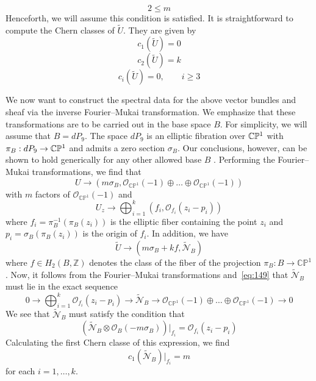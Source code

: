 \documentclass[a4paper,12pt]{article}
\numberwithin{equation}{section}
\newcommand{\cp}[1]{{\mathbb C}{\mathbb P}^{#1}}
\def\cN{{\mathcal N}}
\def\cO{{\mathcal O}}
\theoremstyle{plain}
\begin{document}
\begin{equation}
2 \leq m
\label{eq:150A}
\end{equation}
Henceforth, we will assume this condition is satisfied.
It is straightforward to compute the Chern classes of
$\widetilde{U}$. They are given by
\begin{equation}
c_{1}(\widetilde{U})=0
\label{eq:151}
\end{equation}
\begin{equation}
c_{2}(\widetilde{U})=k
\label{eq:152}
\end{equation}
\begin{equation}
c_{i}(\widetilde{U})=0, \qquad i\geq3
\label{eq:153}
\end{equation}


We now want to construct the spectral data for the above vector bundles and sheaf
via the inverse Fourier--Mukai transformation. We emphasize that these
transformations are to be carried out in the base space $B$. For simplicity,
we will assume that $B=dP_{9}$. The space $dP_{9}$ is an elliptic 
fibration over $\cp{1} \rm$ with $\pi_{B}:dP_{9} \rightarrow \cp{1} \rm$
and admits a zero section $\sigma_{B}$. Our conclusions, 
however, can be shown to hold generically for any other 
allowed base $B$ \cite{mathpaper}. 
Performing the Fourier--Mukai transformations, we find that
\begin{equation}
U \longrightarrow (m\sigma_{B}, {\mathcal O}_{\cp{1}}(-1)\oplus 
\ldots \oplus {\mathcal O}_{\cp{1}}(-1))
\label{eq:154}
\end{equation}
with $m$ factors of ${\mathcal O}_{\cp{1}}(-1)$ and
\begin{equation}
U_{z} \longrightarrow \bigoplus_{i=1}^{k}
(f_{i}, \cO_{f_{i}}(z_{i}-p_{i}))
\label{eq:155}
\end{equation}
where $f_{i}=\pi_{B}^{-1}(\pi_{B}(z_{i}))$ is the elliptic fiber containing
the point $z_{i}$ and $p_{i} = \sigma_{B}(\pi_{B}(z_{i}))$ is the
origin of $f_{i}$.
In addition, we have
\begin{equation}
\widetilde{U} \longrightarrow (m\sigma_{B} + kf, \widetilde{\cN}_{B})
\label{eq:156}
\end{equation}
where $f \in H_{2}(B,{\mathbb Z})$ denotes the class of the fiber of
the projection $\pi_{B} : B \to \cp{1}$. 
Now, it follows from the Fourier--Mukai transformations and~\eqref{eq:149}
that $\widetilde{\cN}_{B}$ must lie in the exact sequence
\begin{equation}
0 \rightarrow \bigoplus_{i=1}^{k}\cO_{f_{i}}(z_{i}-p_{i})
\rightarrow \widetilde{\cN}_{B} \rightarrow 
{\mathcal O}_{\cp{1}}(-1)\oplus 
\ldots \oplus {\mathcal O}_{\cp{1}}(-1)
\rightarrow 0
\label{eq:157}
\end{equation}
We see that $\widetilde{\cN}_{B}$ must satisfy the condition that
\begin{equation}
\left(\widetilde{\cN}_{B}\otimes
\cO_{B}(-m\sigma_{B})\right)|_{f_{i}}=  \cO_{f_{i}}(z_{i}-p_{i})
\label{eq:159}
\end{equation}
Calculating the first Chern classe of this expression, we find 
\begin{equation} 
c_{1}(\widetilde{\cN}_{B})|_{f_{i}}=m
\label{eq:161}
\end{equation}
for each $i=1, \ldots, k$.
 
\end{document}
